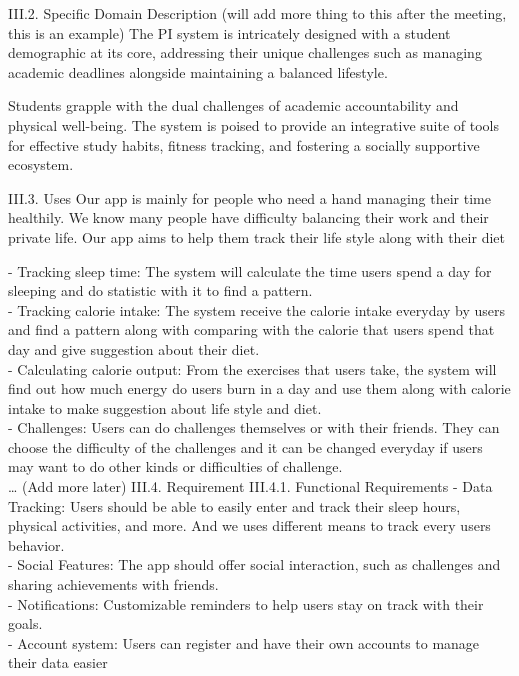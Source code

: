 \documentclass[12pt]{article}
\begin{document}
III.2. Specific Domain Description (will add more thing to this after the meeting, this is an example)
The PI system is intricately designed with a student demographic at its core, addressing their unique challenges such as managing academic deadlines alongside maintaining a balanced lifestyle.\par
Students grapple with the dual challenges of academic accountability and physical well-being. The system is poised to provide an integrative suite of tools for effective study habits, fitness tracking, and fostering a socially supportive ecosystem.\par
 
III.3. Uses
Our app is mainly for people who need a hand managing their time healthily. We know many people have difficulty balancing their work and their private life. Our app aims to help them track their life style along with their diet\par
-    Tracking sleep time: The system will calculate the time users spend a day for sleeping and do statistic with it to find a pattern.\\
-    Tracking calorie intake: The system receive the calorie intake everyday by users and find a pattern along with comparing with the calorie that users spend that day and give suggestion about their diet.\\
-    Calculating calorie output: From the exercises that users take, the system will find out how much energy do users burn in a day and use them along with calorie intake to make suggestion about life style and diet.\\
-    Challenges: Users can do challenges themselves or with their friends. They can choose the difficulty of the challenges and it can be changed everyday if users may want to do other kinds or difficulties of challenge.\\
…
(Add more later)
III.4. Requirement
III.4.1. Functional Requirements
-    Data Tracking: Users should be able to easily enter and track their sleep hours, physical activities, and more. And we uses different means to track every users behavior.\\
-    Social Features: The app should offer social interaction, such as challenges and sharing achievements with friends.\\
-    Notifications: Customizable reminders to help users stay on track with their goals.\\
-    Account system: Users can register and have their own accounts to manage their data easier\\
\end{document}
